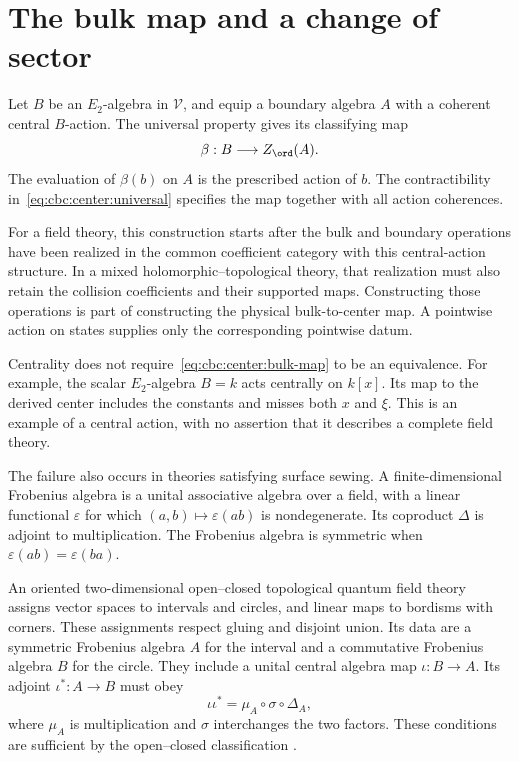 \section{The bulk map and a change of sector}

Let $B$ be an $E_2$-algebra in $\mathcal V$, and equip a boundary algebra $A$ with a coherent central $B$-action.
The universal property gives its classifying map
\begin{equation}\label{eq:cbc:center:bulk-map}
 \beta:B\longrightarrow Z_{\ord}(A).
\end{equation}
The evaluation of $\beta(b)$ on $A$ is the prescribed action of $b$.
The contractibility in~\eqref{eq:cbc:center:universal} specifies the map together with all action coherences.

For a field theory, this construction starts after the bulk and boundary operations have been realized in the common coefficient category with this central-action structure.
In a mixed holomorphic--topological theory, that realization must also retain the collision coefficients and their supported maps.
Constructing those operations is part of constructing the physical bulk-to-center map.
A pointwise action on states supplies only the corresponding pointwise datum.

Centrality does not require~\eqref{eq:cbc:center:bulk-map} to be an equivalence.
For example, the scalar $E_2$-algebra $B=k$ acts centrally on $k[x]$.
Its map to the derived center includes the constants and misses both $x$ and $\xi$.
This is an example of a central action, with no assertion that it describes a complete field theory.

The failure also occurs in theories satisfying surface sewing.
A finite-dimensional Frobenius algebra is a unital associative algebra over a field, with a linear functional $\varepsilon$ for which $(a,b)\mapsto\varepsilon(ab)$ is nondegenerate.
Its coproduct $\Delta$ is adjoint to multiplication.
The Frobenius algebra is symmetric when $\varepsilon(ab)=\varepsilon(ba)$.

An oriented two-dimensional open--closed topological quantum field theory assigns vector spaces to intervals and circles, and linear maps to bordisms with corners.
These assignments respect gluing and disjoint union.
Its data are a symmetric Frobenius algebra $A$ for the interval and a commutative Frobenius algebra $B$ for the circle.
They include a unital central algebra map $\iota:B\to A$.
Its adjoint $\iota^*:A\to B$ must obey
\begin{equation}\label{eq:cbc:center:cardy}
 \iota\iota^*=\mu_A\circ\sigma\circ\Delta_A,
\end{equation}
where $\mu_A$ is multiplication and $\sigma$ interchanges the two factors.
These conditions are sufficient by the open--closed classification
\cite[Definition~2.3 and Corollary~4.3]{LaudaPfeiffer2008}.

